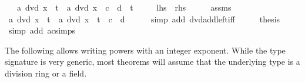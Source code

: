 \begin{isabellebody}
\ \ \ {\isachardoublequoteopen}a\ dvd\ {\isacharparenleft}{\kern0pt}x\ {\isacharplus}{\kern0pt}\ t{\isacharparenright}{\kern0pt}\ {\isasymlongleftrightarrow}\ a\ dvd\ {\isacharparenleft}{\kern0pt}{\isacharparenleft}{\kern0pt}x\ {\isacharplus}{\kern0pt}\ c\ {\isacharasterisk}{\kern0pt}\ d{\isacharparenright}{\kern0pt}\ {\isacharplus}{\kern0pt}\ t{\isacharparenright}{\kern0pt}{\isachardoublequoteclose}\isanewline
\ \ \ \ {\isacharparenleft}{\kern0pt}\ {\isachardoublequoteopen}{\isacharquery}{\kern0pt}lhs\ {\isasymlongleftrightarrow}\ {\isacharquery}{\kern0pt}rhs{\isachardoublequoteclose}{\isacharparenright}{\kern0pt}\isanewline
%
\isadelimproof
%
\endisadelimproof
%
\isatagproof
{}\isamarkupfalse%
\ {\isacharminus}{\kern0pt}\isanewline
\ \ \isamarkupfalse%
\ assms\ \isamarkupfalse%
\ {\isachardoublequoteopen}a\ dvd\ {\isacharparenleft}{\kern0pt}x\ {\isacharplus}{\kern0pt}\ t{\isacharparenright}{\kern0pt}\ {\isasymlongleftrightarrow}\ a\ dvd\ {\isacharparenleft}{\kern0pt}{\isacharparenleft}{\kern0pt}x\ {\isacharplus}{\kern0pt}\ t{\isacharparenright}{\kern0pt}\ {\isacharplus}{\kern0pt}\ c\ {\isacharasterisk}{\kern0pt}\ d{\isacharparenright}{\kern0pt}{\isachardoublequoteclose}\isanewline
\ \ \ \ \isamarkupfalse%
\ {\isacharparenleft}{\kern0pt}simp\ add{\isacharcolon}{\kern0pt}\ dvd{\isacharunderscore}{\kern0pt}add{\isacharunderscore}{\kern0pt}left{\isacharunderscore}{\kern0pt}iff{\isacharparenright}{\kern0pt}\isanewline
\ \ \isamarkupfalse%
\ \isamarkupfalse%
\ {\isacharquery}{\kern0pt}thesis\isanewline
\ \ \ \ \isamarkupfalse%
\ {\isacharparenleft}{\kern0pt}simp\ add{\isacharcolon}{\kern0pt}\ ac{\isacharunderscore}{\kern0pt}simps{\isacharparenright}{\kern0pt}\isanewline
{}\isamarkupfalse%
%
\endisatagproof
{\isafoldproof}%
%
\isadelimproof
%
\endisadelimproof
%
\isadelimdocument
%
\endisadelimdocument
%
\isatagdocument
%
\isamarkuptrue%
%
\endisatagdocument
{\isafolddocument}%
%
\isadelimdocument
%
\endisadelimdocument
%
\begin{isamarkuptext}%
The following allows writing powers with an integer exponent. While the type signature
  is very generic, most theorems will assume that the underlying type is a division ring or
  a field.


\end{isamarkuptext}
\end{isabellebody}
